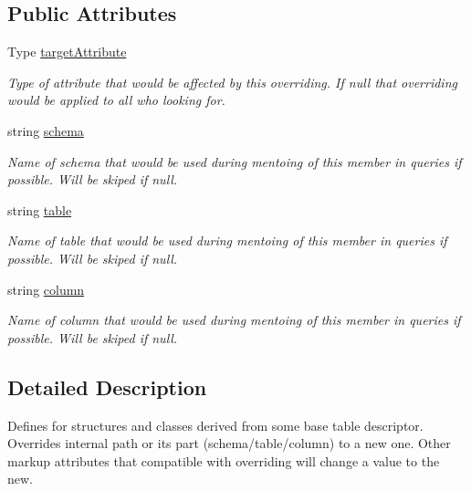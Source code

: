 \subsection*{Public Attributes}
\begin{DoxyCompactItemize}
\item 
Type \mbox{\hyperlink{class_uniform_data_operator_1_1_sql_1_1_markup_1_1_modifiers_1_1_d_b_path_override_attribute_ad6b2408b337cc95c58034f0130c89ac8}{target\+Attribute}}
\begin{DoxyCompactList}\small\item\em Type of attribute that would be affected by this overriding. If null that overriding would be applied to all who looking for. \end{DoxyCompactList}\item 
string \mbox{\hyperlink{class_uniform_data_operator_1_1_sql_1_1_markup_1_1_modifiers_1_1_d_b_path_override_attribute_ae30de021946efb358325415cf7e1bde2}{schema}}
\begin{DoxyCompactList}\small\item\em Name of schema that would be used during mentoing of this member in queries if possible. Will be skiped if null. \end{DoxyCompactList}\item 
string \mbox{\hyperlink{class_uniform_data_operator_1_1_sql_1_1_markup_1_1_modifiers_1_1_d_b_path_override_attribute_a3f5c9e2892d5061f92d59d17b2636acb}{table}}
\begin{DoxyCompactList}\small\item\em Name of table that would be used during mentoing of this member in queries if possible. Will be skiped if null. \end{DoxyCompactList}\item 
string \mbox{\hyperlink{class_uniform_data_operator_1_1_sql_1_1_markup_1_1_modifiers_1_1_d_b_path_override_attribute_a30bd9209a06db42db371c857573af3be}{column}}
\begin{DoxyCompactList}\small\item\em Name of column that would be used during mentoing of this member in queries if possible. Will be skiped if null. \end{DoxyCompactList}\end{DoxyCompactItemize}


\subsection{Detailed Description}
Defines for structures and classes derived from some base table descriptor. Overrides internal path or its part (schema/table/column) to a new one. Other markup attributes that compatible with overriding will change a value to the new. 



